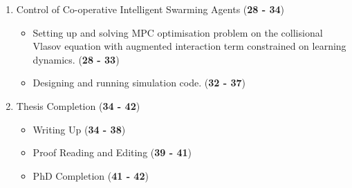 \documentclass[.../main.tex]{subfiles}
\begin{document}
\begin{enumerate}
		\item Control of Co-operative Intelligent Swarming Agents (\textbf{28 - 34})
		\begin{itemize}
			\item Setting up and solving MPC optimisation problem on the collisional Vlasov
			equation with augmented interaction term constrained on learning dynamics. (\textbf{28 -
			33})
			\item Designing and running simulation code. (\textbf{32 - 37})
		\end{itemize}

		\item Thesis Completion (\textbf{34 - 42})
		\begin{itemize}
			\item Writing Up (\textbf{34 - 38})
			\item Proof Reading and Editing (\textbf{39 - 41})
			\item PhD Completion (\textbf{41 - 42})
		\end{itemize}

	\end{enumerate}
\end{document}
